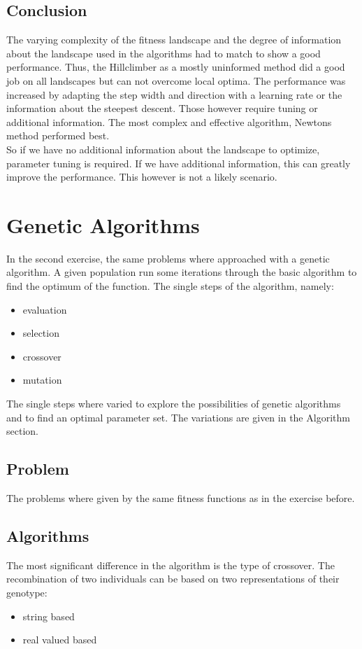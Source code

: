 \documentclass{scrartcl}
\begin{document}
\subsection{Conclusion}
The varying complexity of the fitness landscape and the degree of information about the landscape used in the algorithms had to match to show a good performance. Thus, the Hillclimber as a mostly uninformed method did a good job on all landscapes but can not overcome local optima. The performance was increased by adapting the step width and direction with a learning rate or the information about the steepest descent. Those however require tuning or additional information. The most complex and effective algorithm, Newtons method performed best.\\
So if we have no additional information about the landscape to optimize, parameter tuning is required. If we have additional information, this can greatly improve the performance. This however is not a likely scenario.



\section{Genetic Algorithms}
In the second exercise, the same problems where approached with a genetic algorithm. A given population run some iterations through the basic algorithm to find the optimum of the function. The single steps of the algorithm, namely:\\

\begin{itemize}
\item evaluation
\item selection
\item crossover
\item mutation
\end{itemize}

The single steps where varied to explore the possibilities of genetic algorithms and to find an optimal parameter set. The variations are given in the Algorithm section.



\subsection{Problem}
The problems where given by the same fitness functions as in the exercise before.

\subsection{Algorithms}
The most significant difference in the algorithm is the type of crossover. The recombination of two individuals can be based on two representations of their genotype:
\begin{itemize}
\item string based
\item real valued based
\end{itemize}
\end{document}
